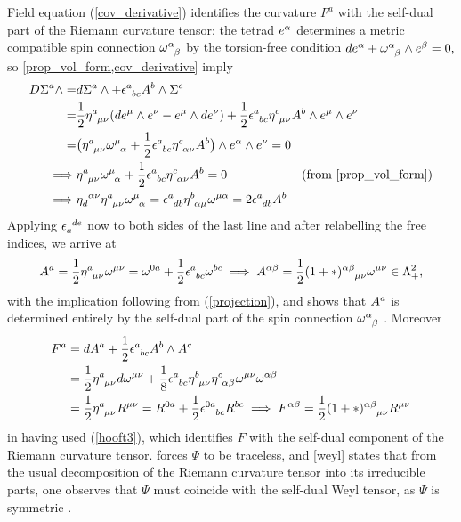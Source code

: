 \documentclass[a4paper,12pt, onecolumn, notitlepage]{article}
\theoremstyle{definition}
\theoremstyle{remark}
\newcommand{\al}{\alpha}
\newcommand{\w}{\omega}
\newcommand{\m}{\mu}
\newcommand{\n}{\nu}
\newcommand{\e}{\epsilon}
\newcommand{\hooft}[3]{\eta\indices{^{#1}_{#2}_{#3}}}
\newcommand{\ihooft}[3]{\eta\indices{_{#1}^{#2}^{#3}}}
\begin{document}
Field equation (\ref{cov_derivative}) identifies the curvature $F^{a}$ with the self-dual part of the Riemann curvature tensor; the tetrad $e\indices{^\al}$ determines a metric compatible spin connection $\w\indices{^\al_\beta}$ by the torsion-free condition $de\indices{^\al} + \w\indices{^\al_\beta}\wedge e\indices{^\beta}=0,$ so \cref{prop_vol_form,cov_derivative} imply
\begin{align*}
	D\Sigma\indices{^a}\wedge =& d\Sigma\indices{^a}\wedge + \e\indices{^a_b_c}A\indices{^b}\wedge\Sigma\indices{^c}\\
	=&\frac{1}{2}\hooft{a}{\m}{\n}(de\indices{^\m}\wedge e\indices{^\n} - e\indices{^\m}\wedge de\indices{^\n}) +\frac{1}{2}\e\indices{^a_b_c}\hooft{c}{\m}{\n}A^{b}\wedge e^{\m}\wedge e^{\n}\\
	=&\big(\hooft{a}{\m}{\n}\w\indices{^\m_\al} +\frac{1}{2}\e\indices{^a_b_c}\hooft{c}{\al}{\n}A^{b}\big)\wedge e^{\al}\wedge e^{\n}=0\\
	\implies& \hooft{a}{\m}{\n}\w\indices{^\m_\al} +\frac{1}{2}\e\indices{^a_b_c}\hooft{c}{\al}{\n}A^{b}=0\qquad\qquad\qquad (\text{from \ref{prop_vol_form})}\\
	\implies& \ihooft{d}{\al}{\n}\hooft{a}{\m}{\n}\w\indices{^\m_\al}=\e\indices{^a_d_b}\hooft{b}{\al}{\m}\w\indices{^\m^\al}=2\e\indices{^a_d_b}A^{b}
\end{align*}
Applying $\e\indices{_a^d^e}$ now to both sides of the last line and after relabelling the free indices, we arrive at
\begin{align*}
	A\indices{^a}=\frac{1}{2}\hooft{a}{\m}{\n}\w\indices{^\m^\n} = \w\indices{^0^a} + \frac{1}{2} \e\indices{^a_b_c}\w\indices{^b^c}
	\implies A^{\al\beta} = \frac{1}{2}(1+\ast)\indices{^\al^\beta_\m_\n}\w\indices{^\m^\n}\in\Lambda^{2}_{+},
\end{align*}
with the implication following from (\ref{projection}), and shows that $A\indices{^a}$ is determined entirely by the self-dual part of the spin connection $\w\indices{^\al_\beta}$ \cite{capovilla_1989}. Moreover
\begin{align*}
	F\indices{^a} &= dA\indices{^a} + \frac{1}{2}\e\indices{^a_b_c}A\indices{^b}\wedge A\indices{^c}\\
	&=\frac{1}{2}\hooft{a}{\m}{\n}d\w\indices{^\m^\n}+\frac{1}{8}\e\indices{^a_b_c}\hooft{b}{\m}{\n}\hooft{c}{\al}{\beta}\w\indices{^\m^\n} \w\indices{^\al^\beta}\\
	&=\frac{1}{2}\hooft{a}{\m}{\n}R\indices{^\m^\n}= R^{0a}+\frac{1}{2}\e\indices{^0^a_b_c}R^{bc}
	\implies F\indices{^\al^\beta} = \frac{1}{2}(1+\ast)\indices{^\al^\beta_\m_\n}R\indices{^\m^\n}
\end{align*}
in having used (\ref{hooft3}), which identifies $F$ with the self-dual component of the Riemann curvature tensor.  forces $\Psi$ to be traceless, and \cref{weyl} states that from the usual decomposition of the Riemann curvature tensor into its irreducible parts, one observes that $\Psi$ must coincide with the self-dual Weyl tensor, as $\Psi$ is symmetric \cite{capovilla_1993}.\\
	
\end{document}
